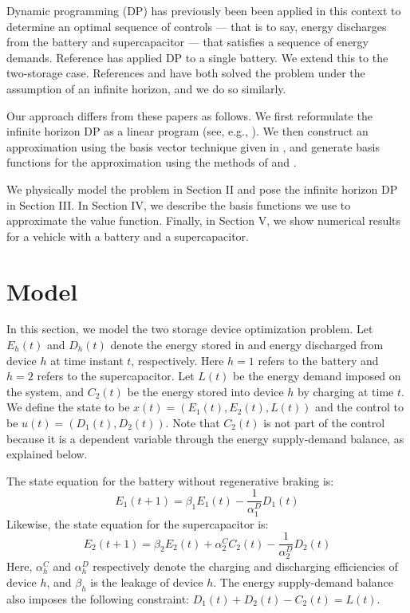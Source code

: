 \documentclass[conference]{IEEEtran}
\begin{document}
Dynamic programming (DP) has previously been been applied in this context to determine an optimal sequence of controls --- that is to say, energy discharges from the battery and supercapacitor --- that satisfies a sequence of energy demands. Reference \cite{su2013modeling} has applied DP to a single battery. We extend this to the two-storage case. References \cite{8330176} and \cite{8315074} have both solved the problem under the assumption of an infinite horizon, and we do so similarly.

Our approach differs from these papers as follows. We first reformulate the infinite horizon DP as a linear program (see, e.g., \cite{Bertsekas:2007:DPO:1396348}). We then construct an approximation using the basis vector technique given in \cite{deFarias:2003:LPA:970869.970918}, and generate basis functions for the approximation using the methods of \cite{Bellman:1957} and \cite{Bellman1962}. %

We physically model the problem in Section II and pose the infinite horizon DP in Section III. In Section IV, we describe the basis functions we use to approximate the value function. Finally, in Section V, we show numerical results for a vehicle with a battery and a supercapacitor. 


\section{Model}
In this section, we model the two storage device optimization problem. Let $E_{h}(t)$ and $D_{h}(t)$ denote the energy stored in and energy discharged from device $h$ at time instant $t$, respectively. Here $h=1$ refers to the battery and $h=2$ refers to the supercapacitor. Let $L(t)$ be the energy demand imposed on the system, and $C_{2}(t)$ be the energy stored into device $h$ by charging at time $t$. We define the state to be $x(t)=(E_{1}(t),E_{2}(t),L(t))$ and the control to be $u(t)=(D_{1}(t),D_{2}(t))$. Note that $C_{2}(t)$ is not part of the control because it is a dependent variable through the energy supply-demand balance, as explained below.

The state equation for the battery without regenerative braking is:
\begin{equation} \label{eq:BattStateEqn}
    E_{1}(t+1)=\beta_{1}E_{1}(t)-\frac{1}{\alpha_{1}^{D}}D_{1}(t)
\end{equation} Likewise, the state equation for the supercapacitor is:
\begin{equation} \label{eq:SupercStateEqn}
    E_{2}(t+1)=\beta_{2}E_{2}(t)+\alpha_{2}^{C}C_{2}(t)-\frac{1}{\alpha_{2}^{D}}D_{2}(t)
\end{equation} Here, $\alpha^{C}_{h}$ and $\alpha^{D}_{h}$ respectively denote the charging and discharging efficiencies of device $h$, and $\beta_{h}$ is the leakage of device $h$. The energy supply-demand balance also imposes the following constraint: $D_{1}(t) + D_{2}(t) - C_{2}(t) = L(t)$. %
\end{document}

